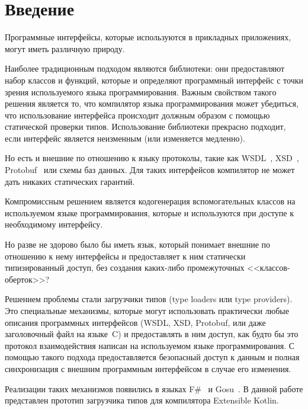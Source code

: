 \clearpage
\section*{Введение}

Программные интерфейсы, которые используются в прикладных приложениях, могут иметь различную природу.

Наиболее традиционным подходом являются библиотеки: они предоставляют набор классов и функций, которые и определяют программный интерфейс с точки зрения используемого языка программирования.
Важным свойством такого решения является то, что компилятор языка программирования может убедиться, что использование интерфейса происходит должным образом с помощью статической проверки типов.
Использование библиотеки прекрасно подходит, если интерфейс является неизменным (или изменяется медленно).

Но есть и внешние по отношению к языку протоколы, такие как WSDL~\cite{wsdl}, XSD~\cite{xsd1, xsd2}, Protobuf~\cite{protobuf} или схемы баз данных. Для таких интерфейсов компилятор не может дать никаких статических гарантий.

Компромиссным решением является кодогенерация вспомогательных классов на используемом языке программирования, которые и используются при доступе к необходимому интерфейсу.

Но разве не здорово было бы иметь язык, который понимает внешние по отношению к нему интерфейсы и предоставляет к ним статически типизированный доступ, без создания каких-либо промежуточных <<классов-оберток>>?

Решением проблемы стали загрузчики типов (type loaders или type providers). Это специальные механизмы, которые могут использовать практически любые описания программных интерфейсов
(WSDL, XSD, Protobuf, или даже заголовочный файл на языке~C) и предоставлять в ним доступ, как будто бы это протокол взаимодействия написан на используемом языке программирования.
С помощью такого подхода предоставляется безопасный доступ к данным и полная синхронизация с внешним программным интерфейсом в случае его изменения.

Реализации таких механизмов появились в языках F\#~\cite{fsharp2010expert} и Gosu~\cite{gosuguide}. В данной работе представлен прототип загрузчика типов для компилятора Extensible Kotlin.

\clearpage